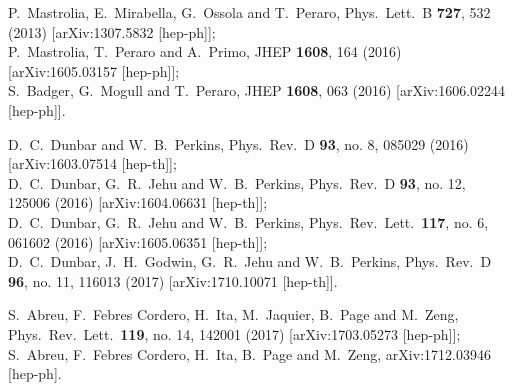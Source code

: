 \documentclass[aps,prd,preprint,groupedaddress,nofootinbib,showpacs,eqsecnum]{revtex4}
\begin{document}
\begin{thebibliography}{99}
P.~Mastrolia, E.~Mirabella, G.~Ossola and T.~Peraro,
Phys.\ Lett.\ B {\bf 727}, 532 (2013)
[arXiv:1307.5832 [hep-ph]];\\
P.~Mastrolia, T.~Peraro and A.~Primo,
JHEP {\bf 1608}, 164 (2016)
[arXiv:1605.03157 [hep-ph]];\\
S.~Badger, G.~Mogull and T.~Peraro,
JHEP {\bf 1608}, 063 (2016)
[arXiv:1606.02244 [hep-ph]].

D.~C.~Dunbar and W.~B.~Perkins,
Phys.\ Rev.\ D {\bf 93}, no. 8, 085029 (2016)
[arXiv:1603.07514 [hep-th]];\\
D.~C.~Dunbar, G.~R.~Jehu and W.~B.~Perkins,
Phys.\ Rev.\ D {\bf 93}, no. 12, 125006 (2016)
[arXiv:1604.06631 [hep-th]];\\
D.~C.~Dunbar, G.~R.~Jehu and W.~B.~Perkins,
Phys.\ Rev.\ Lett.\  {\bf 117}, no. 6, 061602 (2016)
[arXiv:1605.06351 [hep-th]];\\
D.~C.~Dunbar, J.~H.~Godwin, G.~R.~Jehu and W.~B.~Perkins,
Phys.\ Rev.\ D {\bf 96}, no. 11, 116013 (2017)
[arXiv:1710.10071 [hep-th]].

S.~Abreu, F.~Febres Cordero, H.~Ita, M.~Jaquier, B.~Page and M.~Zeng,
Phys.\ Rev.\ Lett.\  {\bf 119}, no. 14, 142001 (2017)
[arXiv:1703.05273 [hep-ph]];\\
S.~Abreu, F.~Febres Cordero, H.~Ita, B.~Page and M.~Zeng,
arXiv:1712.03946 [hep-ph].


\end{thebibliography}
\end{document}
